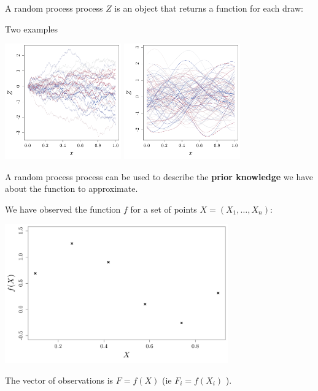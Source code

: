 \documentclass{beamer}
\begin{document}
\begin{frame}{}
A random process process $Z$ is an object that returns a function for each draw:
\begin{exampleblock}{Two examples}	
\begin{center}
\includegraphics[height=5cm]{figures/R/GPR_simBrown} \qquad \includegraphics[height=5cm]{figures/R/GPR_simGauss}
\end{center}
\end{exampleblock}
A random process process can be used to describe the \textbf{prior knowledge} we have about the function to approximate.
\end{frame}

\begin{frame}{}
We have observed the function $f$ for a set of points $X = (X_1,\dots,X_n)$:
\begin{center}
\includegraphics[height=6cm]{figures/R/GPR_obs}
\end{center}
The vector of observations is $F=f(X)$ (ie $F_i = f(X_i)$ ).
\end{frame}
\end{document}
